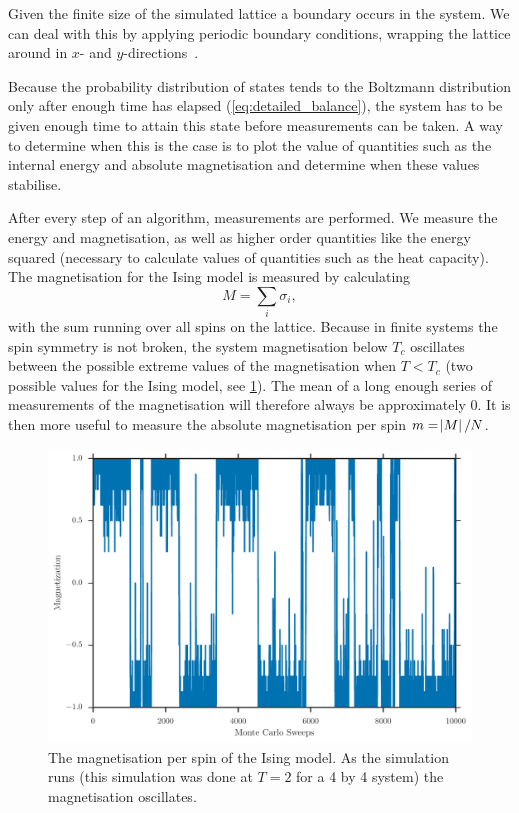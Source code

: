\documentclass[11pt, a4paper]{report} %
\begin{document}
Given the finite size of the simulated lattice a boundary occurs in the system.
We can deal with this by applying periodic boundary conditions, wrapping the lattice around in \(x\)- and \(y\)-directions~\cite{landau:2015}.

Because the probability distribution of states tends to the Boltzmann distribution only after enough time has elapsed (\cref{eq:detailed_balance}), the system has to be given enough time to attain this state before measurements can be taken.
A way to determine when this is the case is to plot the value of quantities such as the internal energy and absolute magnetisation and determine when these values stabilise.

After every step of an algorithm, measurements are performed.
We measure the energy and magnetisation, as well as higher order quantities like the energy squared (necessary to calculate values of quantities such as the heat capacity).
The magnetisation for the Ising model is measured by calculating
\begin{equation}
	M = \sum_i \sigma_i,
\end{equation}
with the sum running over all spins on the lattice.
Because in finite systems the spin symmetry is not broken, the system magnetisation below \(T_c\) oscillates between the possible extreme values of the magnetisation when \(T<T_c\) (two possible values for the Ising model, see \cref{fig:ising_4by4_magnetization_history}).
The mean of a long enough series of measurements of the magnetisation will therefore always be approximately 0.
It is then more useful to measure the absolute magnetisation per spin \(m = \abs{M} / N\).
\begin{figure}
	\includegraphics[width=\linewidth]{ising_4by4_magnetization_history.pdf}
	\caption{The magnetisation per spin of the Ising model. As the simulation runs (this simulation was done at \(T=2\) for a 4 by 4 system) the magnetisation oscillates.}
	\label{fig:ising_4by4_magnetization_history}
\end{figure}
\end{document}
